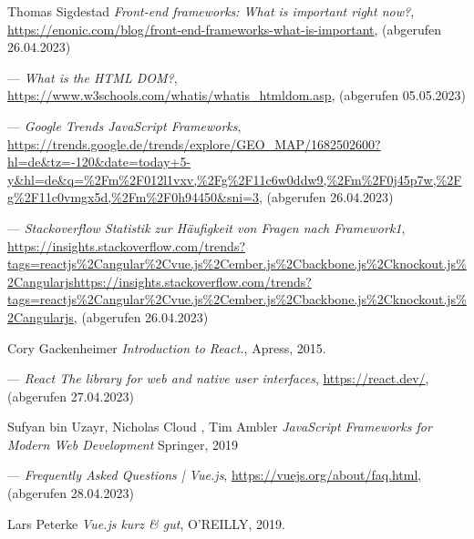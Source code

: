 %

\begin{thebibliography}{99}

    Thomas Sigdestad
	\emph{Front-end frameworks: What is important right now?},
	\url{https://enonic.com/blog/front-end-frameworks-what-is-important},
    (abgerufen 26.04.2023)

	---
	\emph{What is the HTML DOM?},
	\url{https://www.w3schools.com/whatis/whatis_htmldom.asp},
	(abgerufen 05.05.2023)

	---
	\emph{Google Trends JavaScript Frameworks},
	\url{https://trends.google.de/trends/explore/GEO_MAP/1682502600?hl=de&tz=-120&date=today+5-y&hl=de&q=%2Fm%2F012l1vxv,%2Fg%2F11c6w0ddw9,%2Fm%2F0j45p7w,%2Fg%2F11c0vmgx5d,%2Fm%2F0h94450&sni=3},
	(abgerufen 26.04.2023)

	---
	\emph{Stackoverflow Statistik zur Häufigkeit von Fragen nach Framework1},
	\url{https://insights.stackoverflow.com/trends?tags=reactjs%2Cangular%2Cvue.js%2Cember.js%2Cbackbone.js%2Cknockout.js%2Cangularjshttps://insights.stackoverflow.com/trends?tags=reactjs%2Cangular%2Cvue.js%2Cember.js%2Cbackbone.js%2Cknockout.js%2Cangularjs},
	(abgerufen 26.04.2023)

	Cory Gackenheimer
	\emph{Introduction to React.},
	Apress,
	2015.

	---
	\emph{React
	The library for web and native user interfaces},
	\url{https://react.dev/},
	(abgerufen 27.04.2023)

	Sufyan bin Uzayr, Nicholas Cloud , Tim Ambler
	\emph{JavaScript Frameworks for Modern Web Development}
	Springer,
	2019

	---
	\emph{Frequently Asked Questions | Vue.js},
	\url{https://vuejs.org/about/faq.html},
	(abgerufen 28.04.2023)

	Lars Peterke
	\emph{Vue.js kurz \& gut},
	O’REILLY,
	2019.


\end{thebibliography}
